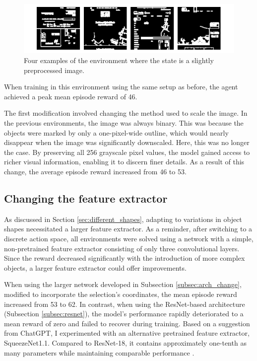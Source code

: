 \documentclass[
  digital,     %
  oneside,     %
  nosansbold,  %
  nocolorbold, %
  lof,         %
  lot,         %
]{fithesis4}
\begin{document}
\begin{figure}
    \centering
    \includegraphics[width=1\linewidth]{env_examples/env9.pdf}
    \caption{Four examples of the environment where the state is a slightly preprocessed image.}
    \label{fig:env9}
\end{figure}

When training in this environment using the same setup as before, the agent achieved a peak mean episode reward of 46.

The first modification involved changing the method used to scale the image. In the previous environments, the image was always binary. This was because the objects were marked by only a one-pixel-wide outline, which would nearly disappear when the image was significantly downscaled. Here, this was no longer the case. By preserving all 256 grayscale pixel values, the model gained access to richer visual information, enabling it to discern finer details. As a result of this change, the average episode reward increased from 46 to 53.

\subsection{Changing the feature extractor}

As discussed in Section \ref{sec:different_shapes}, adapting to variations in object shapes necessitated a larger feature extractor. As a reminder, after switching to a discrete action space, all environments were solved using a network with a simple, non-pretrained feature extractor consisting of only three convolutional layers. Since the reward decreased significantly with the introduction of more complex objects, a larger feature extractor could offer improvements.

When using the larger network developed in Subsection \ref{subsec:arch_change}, modified to incorporate the selection's coordinates, the mean episode reward increased from 53 to 62. In contrast, when using the ResNet-based architecture (Subsection \ref{subsec:resnet}), the model's performance rapidly deteriorated to a mean reward of zero and failed to recover during training. Based on a suggestion from ChatGPT, I experimented with an alternative pretrained feature extractor, SqueezeNet1.1. Compared to ResNet-18, it contains approximately one-tenth as many parameters while maintaining comparable performance \cite{torchvision2016}.
\end{document}
